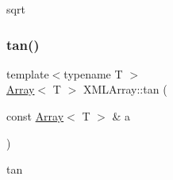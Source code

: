 sqrt 

\mbox{\label{namespaceXMLArray_a2683239081c39ed11300a85ee984a25d}} 
\subsubsection{\texorpdfstring{tan()}{tan()}}
{\footnotesize\ttfamily template$<$typename T $>$ \\
\mbox{\hyperlink{classXMLArray_1_1Array}{Array}}$<$ T $>$ X\+M\+L\+Array\+::tan (\begin{DoxyParamCaption}\item[{const \mbox{\hyperlink{classXMLArray_1_1Array}{Array}}$<$ T $>$ \&}]{a }\end{DoxyParamCaption})\hspace{0.3cm}{\ttfamily [inline]}}



tan 

